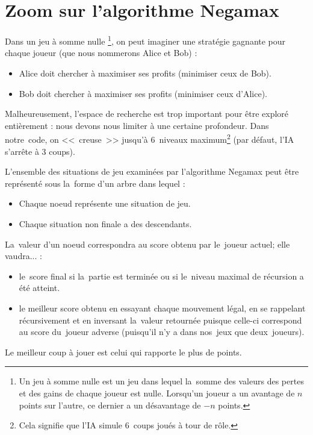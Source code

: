 \section{Zoom sur l'algorithme Negamax}

Dans un jeu à somme nulle
\footnote{Un jeu à somme nulle est un jeu dans lequel la~somme des valeurs des pertes et des gains de chaque joueur est nulle. Lorsqu'un joueur a un avantage de $n$ points sur l'autre, ce dernier a un désavantage de $-n$ points.}, 
on peut imaginer une stratégie gagnante pour chaque joueur (que nous nommerons Alice et Bob) : 
\begin{itemize}
	\item Alice doit chercher à maximiser ses profits (minimiser ceux de Bob).
	\item Bob doit chercher à maximiser ses profits (minimiser ceux d'Alice).
\end{itemize}

Malheureusement, l'espace de recherche est trop important pour être exploré entièrement : 
nous devons nous limiter à une certaine profondeur. Dans notre~code, on <<~creuse~>> jusqu'à 
6~niveaux maximum\footnote{Cela signifie que l'IA simule 6~coups joués à tour de rôle.} 
(par défaut, l'IA s'arrête à 3 coups).

L'ensemble des situations de jeu examinées par l'algorithme Negamax 
peut être représenté sous la~forme d'un arbre dans lequel :
\begin{itemize}
	\item Chaque noeud représente une situation de jeu.
    \item Chaque situation non finale a des descendants.
\end{itemize}

La~valeur d'un noeud correspondra au score obtenu par le~joueur actuel; elle vaudra... :
\begin{itemize}
	\item le~score final si la~partie est terminée ou si le~niveau maximal de récursion a été atteint.
    \item le meilleur score obtenu en essayant chaque mouvement légal, en se rappelant récursivement 
            et en inversant la~valeur retournée puisque celle-ci correspond au score du~joueur adverse 
            (puisqu'il n'y a dans nos~jeux que deux~joueurs).
\end{itemize}

Le meilleur coup à jouer est celui qui rapporte le plus de points.